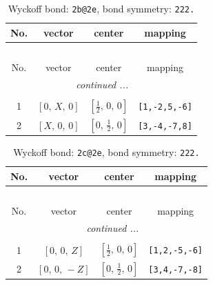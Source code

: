 \documentclass[fleqn,8pt]{jsarticle}
\begin{document}
\renewcommand{\arraystretch}{1.2}
\begin{longtable}{cccc}
\caption{Wyckoff bond: {\tt 2b@2e}, bond symmetry: {\tt 222.}}
 \\
 \hline \hline
No. & vector & center & mapping \\ \hline \endfirsthead

\multicolumn{3}{l}{\tablename\ \thetable{}} \\
 \hline \hline
No. & vector & center & mapping \\ \hline \endhead

 \hline \hline
\multicolumn{3}{r}{\footnotesize\it continued ...} \\ \endfoot

 \hline \hline
\multicolumn{3}{r}{} \\ \endlastfoot

1 & $\left[ 0,\, X,\, 0 \right]$ & $\left[ \frac{1}{2},\, 0,\, 0 \right]$ & {\tt [1,-2,5,-6]} \\ \hline
2 & $\left[ X,\, 0,\, 0 \right]$ & $\left[ 0,\, \frac{1}{2},\, 0 \right]$ & {\tt [3,-4,-7,8]} \\
\end{longtable}
\renewcommand{\arraystretch}{1.2}
\begin{longtable}{cccc}
\caption{Wyckoff bond: {\tt 2c@2e}, bond symmetry: {\tt 222.}}
 \\
 \hline \hline
No. & vector & center & mapping \\ \hline \endfirsthead

\multicolumn{3}{l}{\tablename\ \thetable{}} \\
 \hline \hline
No. & vector & center & mapping \\ \hline \endhead

 \hline \hline
\multicolumn{3}{r}{\footnotesize\it continued ...} \\ \endfoot

 \hline \hline
\multicolumn{3}{r}{} \\ \endlastfoot

1 & $\left[ 0,\, 0,\, Z \right]$ & $\left[ \frac{1}{2},\, 0,\, 0 \right]$ & {\tt [1,2,-5,-6]} \\ \hline
2 & $\left[ 0,\, 0,\, - Z \right]$ & $\left[ 0,\, \frac{1}{2},\, 0 \right]$ & {\tt [3,4,-7,-8]} \\
\end{longtable}
\renewcommand{\arraystretch}{1.2}
\end{document}
